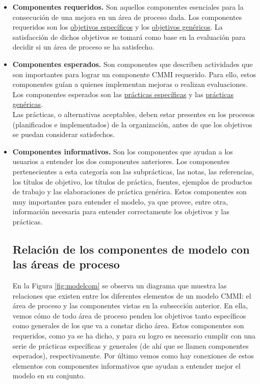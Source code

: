 \begin{itemize}
	\item \textbf{Componentes requeridos.} Son aquellos componentes esenciales para la consecución de una mejora en un área de proceso dada. Los componentes requeridos son los \hyperlink{sgoal}{objetivos específicos} y los \hyperlink{ggoal}{objetivos genéricos}. La satisfacción de dichos objetivos se tomará como base en la evaluación para decidir si un área de proceso se ha satisfecho.
	
	\item \textbf{Componentes esperados.} Son componentes que describen actividades que son importantes para lograr un componente CMMI requerido. Para ello, estos componentes guían a quienes implementan mejoras o realizan evaluaciones. Los componentes esperados son las \hyperlink{spractice}{prácticas específicas} y las \hyperlink{gpractice}{prácticas genéricas}.\\
	Las prácticas, o alternativas aceptables, deben estar presentes en los procesos (planificados e implementados) de la organización, antes de que los objetivos se puedan considerar satisfechos.
	
	\item \textbf{Componentes informativos.} Son los componentes que ayudan a los usuarios a entender los dos componentes anteriores. Los componentes pertenecientes a esta categoría son las subprácticas, las notas, las referencias, los títulos de objetivo, los títulos de práctica, fuentes, ejemplos de productos de trabajo y las elaboraciones de práctica genérica. Estos componentes son muy importantes para entender el modelo, ya que provee, entre otra, información necesaria para entender correctamente los objetivos y las prácticas. 	
	
\subsection{Relación de los componentes de modelo con las áreas de proceso}
En la Figura \ref{fig:modelcom} se observa un diagrama que muestra las relaciones que existen entre los diferentes elementos de un modelo CMMI: el área de proceso y las componentes vistas en la subsección anterior. En ella, vemos cómo de todo área de proceso penden los objetivos tanto específicos como generales de los que va a constar dicho área. Estos componentes son requeridos, como ya se ha dicho, y para su  logro es necesario cumplir con una serie de prácticas específicas y generales (de ahí que se llamen componentes esperados), respectivamente. Por último vemos como hay conexiones de estos elementos con componentes informativos que ayudan a entender mejor el modelo en su conjunto.


\end{itemize}
